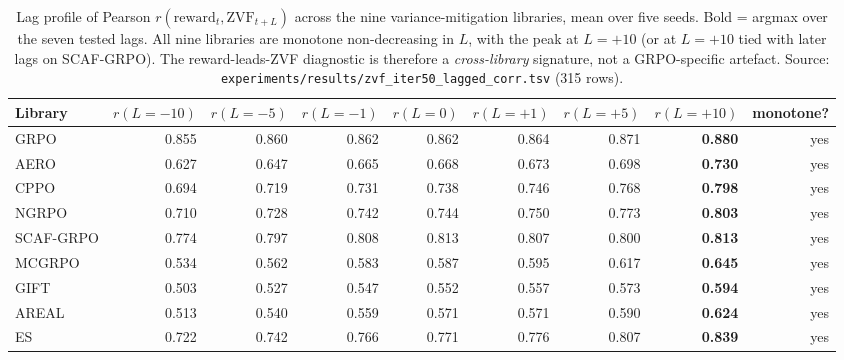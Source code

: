 \documentclass{article}
\begin{document}
\begin{table}[htbp]
\centering
\small
\setlength{\tabcolsep}{4pt}
\begin{tabular}{lrrrrrrrr}
\hline
Library      & $r(L{=}{-}10)$ & $r(L{=}{-}5)$ & $r(L{=}{-}1)$ & $r(L{=}0)$ & $r(L{=}{+}1)$ & $r(L{=}{+}5)$ & $r(L{=}{+}10)$ & monotone? \\
\hline
GRPO         & 0.855 & 0.860 & 0.862 & 0.862 & 0.864 & 0.871 & \textbf{0.880} & yes \\
AERO         & 0.627 & 0.647 & 0.665 & 0.668 & 0.673 & 0.698 & \textbf{0.730} & yes \\
CPPO         & 0.694 & 0.719 & 0.731 & 0.738 & 0.746 & 0.768 & \textbf{0.798} & yes \\
NGRPO        & 0.710 & 0.728 & 0.742 & 0.744 & 0.750 & 0.773 & \textbf{0.803} & yes \\
SCAF-GRPO    & 0.774 & 0.797 & 0.808 & 0.813 & 0.807 & 0.800 & \textbf{0.813} & yes \\
MCGRPO       & 0.534 & 0.562 & 0.583 & 0.587 & 0.595 & 0.617 & \textbf{0.645} & yes \\
GIFT         & 0.503 & 0.527 & 0.547 & 0.552 & 0.557 & 0.573 & \textbf{0.594} & yes \\
AREAL        & 0.513 & 0.540 & 0.559 & 0.571 & 0.571 & 0.590 & \textbf{0.624} & yes \\
ES           & 0.722 & 0.742 & 0.766 & 0.771 & 0.776 & 0.807 & \textbf{0.839} & yes \\
\hline
\end{tabular}
\caption{Lag profile of Pearson $r(\mathrm{reward}_t,\mathrm{ZVF}_{t+L})$
across the nine variance-mitigation libraries, mean over five seeds.
Bold = argmax over the seven tested lags. All nine libraries are
monotone non-decreasing in $L$, with the peak at $L{=}{+}10$ (or at
$L{=}{+}10$ tied with later lags on SCAF-GRPO). The reward-leads-ZVF
diagnostic is therefore a \emph{cross-library} signature, not a
GRPO-specific artefact. Source:
\texttt{experiments/results/zvf_iter50_lagged_corr.tsv} (315 rows).}
\label{tab:zvf-lag-summary}
\end{table}
\end{document}
